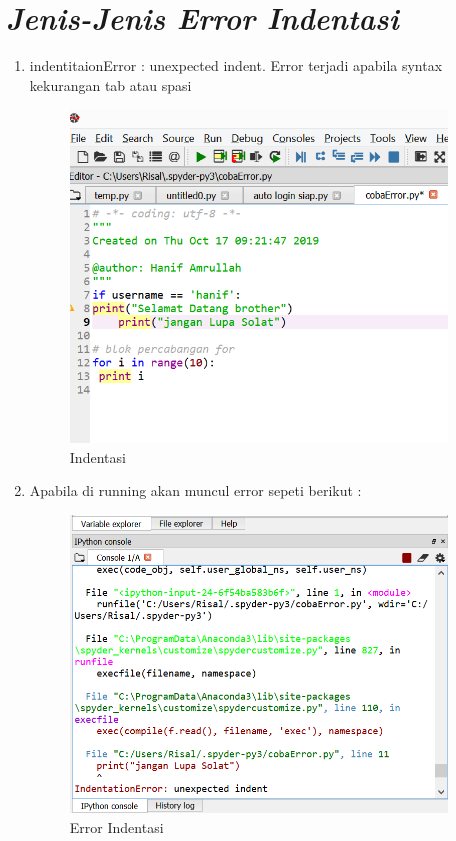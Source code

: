 \section*{\textit{Jenis-Jenis Error Indentasi}}
\begin{enumerate}
\item indentitaionError : unexpected indent. Error terjadi apabila syntax kekurangan tab atau spasi
		\begin{figure}[h]
			\includegraphics[width=10cm]{figure/Error1.png}
			\centering
			\caption{Indentasi}
			\end{figure}
\item Apabila di running akan muncul error sepeti berikut :
		\begin{figure}[h]
			\includegraphics[width=10cm]{figure/Error2.png}
			\centering
			\caption{Error Indentasi}
			\end{figure}
\end{enumerate}
